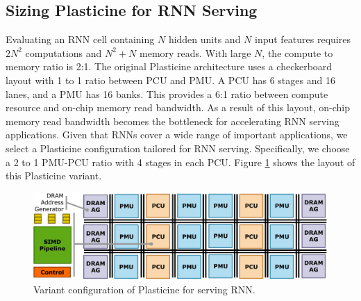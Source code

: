 \subsection{Sizing Plasticine for RNN Serving}
Evaluating an RNN cell containing $N$ hidden units and $N$ input features
  requires $2N^2$ computations and $N^2+N$ memory reads.
With large $N$, the compute to memory ratio is 2:1.
The original Plasticine architecture uses a checkerboard layout
  with 1 to 1 ratio between PCU and PMU.
A PCU has 6 stages and 16 lanes, and a PMU has 16 banks.
This provides a 6:1 ratio between
  compute resource and on-chip memory read bandwidth.
As a result of this layout,
  on-chip memory read bandwidth becomes the bottleneck for accelerating RNN serving applications.
Given that RNNs cover a wide range of important applications,
  we select a Plasticine configuration tailored for RNN serving.
Specifically, we choose a 2 to 1 PMU-PCU ratio with 4 stages in each PCU.
Figure \ref{fig:arch} shows the layout of this Plasticine variant.
\begin{figure}
  \centering
  \includegraphics[width=\columnwidth]{figs/arch.pdf}
  \caption{Variant configuration of Plasticine for serving RNN.}
  \label{fig:arch}
  \vspace*{-0.2in}
\end{figure}
